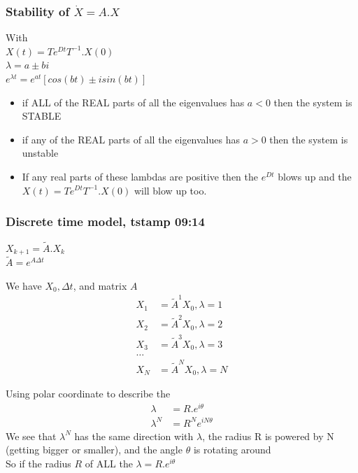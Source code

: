 \documentclass{article}
\begin{document}
\subsubsection{Stability of $\dot{X} = A.X $ }
With 
\\$X(t) = Te^{Dt}T^{-1}.X(0)$
\\$\lambda = a \pm bi$
\\$e^{\lambda t} = e^{at}[cos(bt) \pm isin(bt)]$
\begin{itemize}
  \item if ALL of the REAL parts of all the eigenvalues has $a < 0$ then the system is STABLE
  \item if any of the REAL parts of all the eigenvalues has $a > 0$ then the system is unstable
  \item If any real parts of these lambdas are positive then the $e^{Dt}$ blows up and the $X(t) = Te^{Dt}T^{-1}.X(0)$ will blow up too.
\end{itemize}

\subsubsection{Discrete time model, tstamp 09:14}
$X_{k + 1} = \tilde{A}.X_{k}$
\\$\tilde{A} = e^{A\Delta t}$

We have $X_{0}, \Delta t$, and matrix $A$
\begin{equation}
  \begin{aligned}
    X_{1}  & = {\tilde{A}}^{1}X_{0}, \lambda = 1\\
    X_{2}  & = {\tilde{A}}^{2}X_{0}, \lambda = 2\\
    X_{3}  & = {\tilde{A}}^{3}X_{0}, \lambda = 3\\
    \ldots\\
    X_{N}  & = {\tilde{A}}^{N}X_{0}, \lambda = N
  \end{aligned}  
\end{equation} 

Using polar coordinate to describe the 
\begin{equation}
  \begin{aligned}
    \lambda &= R.e^{i\theta} \\
    \lambda^{N} &= R^{N}e^{iN\theta}
  \end{aligned}
\end{equation}
We see that $\lambda^N$ has the same direction with $\lambda$,
the radius R is powered by N (getting bigger or smaller), and the angle $\theta$ is rotating around
\\So if the radius $R$ of ALL the $\lambda = R.e^{i\theta}$
\end{document}
